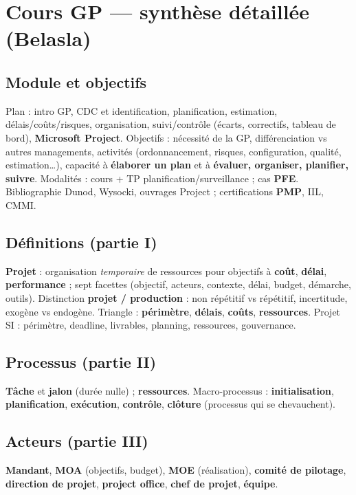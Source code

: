 \documentclass[11pt,a4paper]{article}
\begin{document}
\section{Cours GP — synthèse détaillée (Belasla)}

\subsection{Module et objectifs}
Plan : intro GP, CDC et identification, planification, estimation, délais/coûts/risques, organisation, suivi/contrôle (écarts, correctifs, tableau de bord), \textbf{Microsoft Project}. Objectifs : nécessité de la GP, différenciation vs autres managements, activités (ordonnancement, risques, configuration, qualité, estimation\ldots), capacité à \textbf{élaborer un plan} et à \textbf{évaluer, organiser, planifier, suivre}. Modalités : cours + TP planification/surveillance ; cas \textbf{PFE}. Bibliographie Dunod, Wysocki, ouvrages Project ; certifications \textbf{PMP}, IIL, CMMI.

\subsection{Définitions (partie I)}
\textbf{Projet} : organisation \emph{temporaire} de ressources pour objectifs à \textbf{coût}, \textbf{délai}, \textbf{performance} ; sept facettes (objectif, acteurs, contexte, délai, budget, démarche, outils). Distinction \textbf{projet / production} : non répétitif vs répétitif, incertitude, exogène vs endogène. Triangle : \textbf{périmètre}, \textbf{délais}, \textbf{coûts}, \textbf{ressources}. Projet SI : périmètre, deadline, livrables, planning, ressources, gouvernance.

\subsection{Processus (partie II)}
\textbf{Tâche} et \textbf{jalon} (durée nulle) ; \textbf{ressources}. Macro-processus : \textbf{initialisation}, \textbf{planification}, \textbf{exécution}, \textbf{contrôle}, \textbf{clôture} (processus qui se chevauchent).

\subsection{Acteurs (partie III)}
\textbf{Mandant}, \textbf{MOA} (objectifs, budget), \textbf{MOE} (réalisation), \textbf{comité de pilotage}, \textbf{direction de projet}, \textbf{project office}, \textbf{chef de projet}, \textbf{équipe}.
\end{document}
